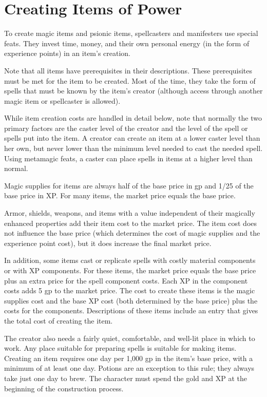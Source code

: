 
\section{Creating Items of Power}
To create magic items and psionic items, spellcasters and manifesters use special feats. They invest time, money, and their own personal energy (in the form of experience points) in an item's creation.

Note that all items have prerequisites in their descriptions. These prerequisites must be met for the item to be created. Most of the time, they take the form of spells that must be known by the item's creator (although access through another magic item or spellcaster is allowed).

While item creation costs are handled in detail below, note that normally the two primary factors are the caster level of the creator and the level of the spell or spells put into the item. A creator can create an item at a lower caster level than her own, but never lower than the minimum level needed to cast the needed spell. Using metamagic feats, a caster can place spells in items at a higher level than normal.

Magic supplies for items are always half of the base price in gp and 1/25 of the base price in XP. For many items, the market price equals the base price.

Armor, shields, weapons, and items with a value independent of their magically enhanced properties add their item cost to the market price. The item cost does not influence the base price (which determines the cost of magic supplies and the experience point cost), but it does increase the final market price.

In addition, some items cast or replicate spells with costly material components or with XP components. For these items, the market price equals the base price plus an extra price for the spell component costs. Each XP in the component costs adds 5 gp to the market price. The cost to create these items is the magic supplies cost and the base XP cost (both determined by the base price) plus the costs for the components. Descriptions of these items include an entry that gives the total cost of creating the item.

The creator also needs a fairly quiet, comfortable, and well-lit place in which to work. Any place suitable for preparing spells is suitable for making items. Creating an item requires one day per 1,000 gp in the item's base price, with a minimum of at least one day. Potions are an exception to this rule; they always take just one day to brew. The character must spend the gold and XP at the beginning of the construction process.

